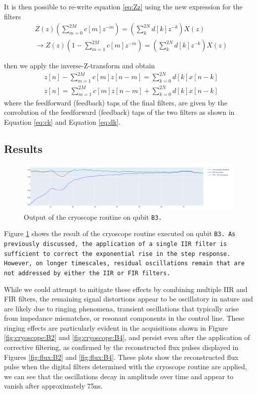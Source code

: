 It is then possible to re-write equation \ref{eq:Zz} using the new expression for the filters
\begin{align}
    & Z(z)\left( \sum_{m=0}^{2M} c[m]z^{-m} \right) = \left( \sum_{k}^{2N} d[k]z^{-k} \right)X(z)\\
    & \rightarrow Z(z)\left(1 - \sum_{m=1}^{2M} c[m]z^{-m} \right) = \left( \sum_{k}^{2N} d[k]z^{-k} \right)X(z) \label{eq:z_final}
\end{align} 

then we apply the inverse-Z-transform and obtain
\begin{align}
    & z[n] - \sum_{m=1}^{2M} c[m]z[n-m] = \sum_{k=0}^{2N} d[k] x[n-k]\\
    & z[n] = \sum_{m=1}^{2M} c[m]z[n-m] + \sum_{k=0}^{2N} d[k] x[n-k]
\end{align}
where the feedforward (feedback) taps of the final filters, are given by the convolution of the feedforward (feedback) taps of the two filters as shown in Equation \ref{eq:ck} and Equation \ref{eq:dk}.

\subsection{Results}

\begin{figure}[h!]
    \centering
    \includegraphics[width=\textwidth]{figures/png/Cryoscope/B3.png}
    \caption{Output of the cryoscope routine on qubit \tt{B3}.}
    \label{fig:cryoscope:B3}
\end{figure} 

Figure \ref{fig:cryoscope:B3} shows the result of the cryoscope routine executed on qubit \tt{B3}. 
As previously discussed, the application of a single IIR filter is sufficient to correct the exponential rise in the step response. 
However, on longer timescales, residual oscillations remain that are not addressed by either the IIR or FIR filters.

While we could attempt to mitigate these effects by combining multiple IIR and FIR filters, the remaining signal distortions appear to be oscillatory in nature and are likely due to ringing phenomena, transient oscillations that typically arise from impedance mismatches, or resonant components in the control line.
These ringing effects are particularly evident in the acquisitions shown in Figure \ref{fig:cryoscope:B2} and \ref{fig:cryoscope:B4}, and persist even after the application of corrective filtering, as confirmed by the reconstructed flux pulses displayed in Figures \ref{fig:flux:B2} and \ref{fig:flux:B4}.
These plots show the reconstructed flux pulse when the digital filters determined with the cryoscope routine are applied, we can see that the oscillations decay in amplitude over time and appear to vanish after approximately 75ns. 

